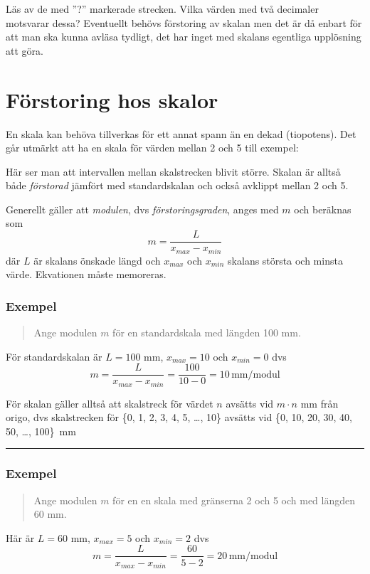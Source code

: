 \documentclass[oneside,11pt,a4paper,swedish]{scrbook}
\newcommand{\startex}[1]{\subsubsection{Exempel}\begin{quote}#1\end{quote}}
\newcommand{\slutex}{\begin{flushright} \rule{1ex}{1ex} \end{flushright}}
\begin{document}
Läs av de med ''?'' markerade strecken. Vilka värden med två decimaler motsvarar dessa? Eventuellt behövs förstoring av skalan men det är då enbart för att man ska kunna avläsa tydligt, det har inget med skalans egentliga upplösning att göra. 


\section{Förstoring hos skalor}

En skala kan behöva tillverkas för ett annat spann än en dekad (tiopotens). Det går utmärkt att ha en skala för värden mellan 2 och 5 till exempel:

\begin{center}
\end{center}


Här ser man att intervallen mellan skalstrecken blivit större. Skalan är alltså både \emph{förstorad} jämfört med standardskalan och också avklippt mellan 2 och 5.

Generellt gäller att \emph{modulen}, dvs \emph{förstoringsgraden}, anges med $m$ och beräknas som \[m = \frac{L}{x_{max}-x_{min}} \]
där $L$ är skalans önskade längd och $x_{max}$ och $x_{min}$ skalans största och minsta värde. Ekvationen måste memoreras.

\startex {Ange modulen $m$ för en standardskala med längden 100 mm.}
För standardskalan är $L = 100$ mm, $x_{max}=10$ och $x_{min}=0$ dvs \[m = \frac{L}{x_{max}-x_{min}}= \frac{100}{10-0} = 10\, \textrm{mm/modul} \]


För skalan gäller alltså att skalstreck för värdet $n$ avsätts vid $m\cdot n$ mm från origo, dvs skalstrecken för \{0, 1, 2, 3, 4, 5, \ldots, 10\} avsätts vid \{0, 10, 20, 30, 40, 50, \ldots, 100\}~mm
\slutex


\startex {Ange modulen $m$ för en en skala med gränserna 2 och 5 och med  längden 60 mm.} Här är $L = 60$ mm, $x_{max}=5$ och $x_{min}=2$ dvs \[m = \frac{L}{x_{max}-x_{min}}= \frac{60}{5-2} = 20\, \textrm{mm/modul} \]
\end{document}
